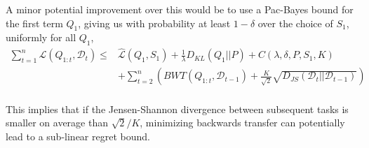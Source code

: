 \documentclass[letterpaper]{article}
\theoremstyle{definition}
\begin{document}
A minor potential improvement over this would be to use a Pac-Bayes bound for the first term $Q_1$, giving us with probability at least $1-\delta$ over the choice of $S_1$, uniformly for all $Q_1$,
\begin{equation}
\begin{split}
\sum_{t=1}^{n}\mathcal{L}(Q_{1:t}, \mathcal{D}_t) \leq &  \hat{\mathcal{L}}(Q_1, S_1)+\frac{1}{\lambda}D_{KL}(Q_1||P)+C(\lambda,\delta,P,S_1, K) \\ &+ \sum_{t=2}^{n}\left ( BWT(Q_{1:t}, \mathcal{D}_{t-1})+ \frac{K}{\sqrt{2}}\sqrt{D_{JS}(\mathcal{D}_{t}||\mathcal{D}_{t-1})}\right ) \\&
\end{split}
\end{equation}

This implies that if the Jensen-Shannon divergence between subsequent tasks is smaller on average than $\sqrt{2}/K$, minimizing backwards transfer can potentially lead to a sub-linear regret bound.

\clearpage


\end{document}
